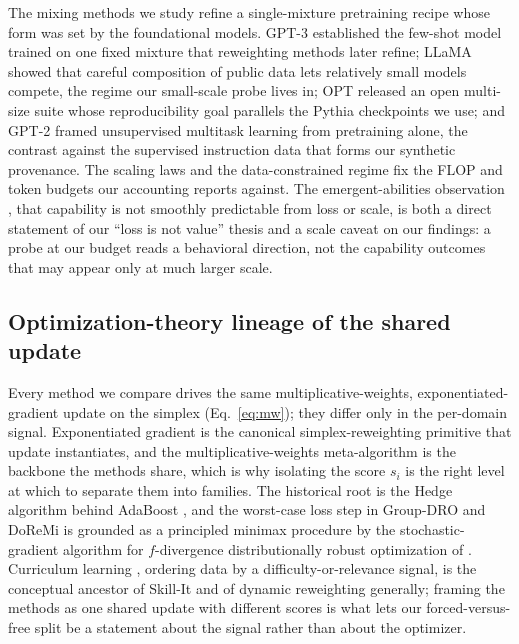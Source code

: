 \documentclass{article}
\begin{document}
The mixing methods we study refine a single-mixture pretraining recipe whose form was set by the foundational models. GPT-3 \citep{brown2020gpt3} established the few-shot model trained on one fixed mixture that reweighting methods later refine; LLaMA \citep{touvron2023llama} showed that careful composition of public data lets relatively small models compete, the regime our small-scale probe lives in; OPT \citep{zhang2022opt} released an open multi-size suite whose reproducibility goal parallels the Pythia \citep{pythia2023} checkpoints we use; and GPT-2 \citep{radford2019gpt2} framed unsupervised multitask learning from pretraining alone, the contrast against the supervised instruction data that forms our synthetic provenance. The scaling laws \citep{kaplan2020scaling, hoffmann2022chinchilla} and the data-constrained regime \citep{muennighoff2023dataconstrained} fix the FLOP and token budgets our accounting reports against. The emergent-abilities observation \citep{wei2022emergent}, that capability is not smoothly predictable from loss or scale, is both a direct statement of our ``loss is not value'' thesis and a scale caveat on our findings: a probe at our budget reads a behavioral direction, not the capability outcomes that may appear only at much larger scale.

\subsection{Optimization-theory lineage of the shared update}

Every method we compare drives the same multiplicative-weights, exponentiated-gradient update on the simplex (Eq.~\eqref{eq:mw}); they differ only in the per-domain signal. Exponentiated gradient \citep{kivinen1997eg} is the canonical simplex-reweighting primitive that update instantiates, and the multiplicative-weights meta-algorithm \citep{arora2012mwu} is the backbone the methods share, which is why isolating the score $s_i$ is the right level at which to separate them into families. The historical root is the Hedge algorithm behind AdaBoost \citep{freund1997adaboost}, and the worst-case loss step in Group-DRO and DoReMi is grounded as a principled minimax procedure by the stochastic-gradient algorithm for $f$-divergence distributionally robust optimization of \citet{namkoong2016drosgd}. Curriculum learning \citep{bengio2009curriculum}, ordering data by a difficulty-or-relevance signal, is the conceptual ancestor of Skill-It and of dynamic reweighting generally; framing the methods as one shared update with different scores is what lets our forced-versus-free split be a statement about the signal rather than about the optimizer.
\end{document}
